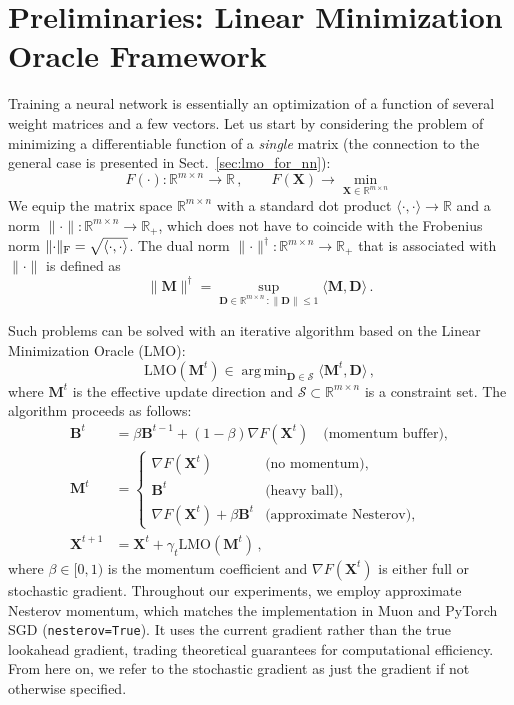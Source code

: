 \documentclass[smallextended,referee,envcountsect]{svjour3}
\def\mB{{\bm{B}}}
\def\mD{{\bm{D}}}
\def\mM{{\bm{M}}}
\def\mX{{\bm{X}}}
\newcommand{\R}{\mathbb{R}}
\DeclareMathOperator*{\argmin}{arg\,min}
\newcommand{\cS}{\mathcal{S}}
\newcommand{\norm}[1]{\lVert #1\rVert}
\DeclarePairedDelimiter{\normf}{\|}{\|_\mathrm{F}}
\def\<#1,#2>{\langle #1,#2\rangle}
\newcommand{\Rmn}{\R^{m\times n}}
\newcommand{\sectionref}[1]{Sect.~\ref{#1}}
\begin{document}
 \section{Preliminaries: Linear Minimization Oracle Framework}
 
 Training a neural network is essentially an optimization of a function of several weight matrices and a few vectors. Let us start by considering the problem of minimizing a differentiable function of a \emph{single} matrix (the connection to the general case is presented in \sectionref{sec:lmo_for_nn}):
 \begin{equation}\label{eq:matrix_problem}
   F(\cdot)\colon \Rmn \to \R\,,\qquad F(\mX) \to \min_{\mX \in \Rmn}\,
 \end{equation}
 We equip the matrix space $\Rmn$ with a standard dot product $\<\cdot, \cdot> \to \R$ and a norm $\norm{\cdot}\colon \Rmn \to \R_+$, which does not have to coincide with the Frobenius norm $\normf{\cdot} = \sqrt{\<\cdot,\cdot>}$. The dual norm $\norm{\cdot}^\dagger\colon \Rmn \to \R_+$ that is associated with $\norm{\cdot}$ is defined as
 \begin{equation}\label{eq:dual_norm}
   \norm{\mM}^\dagger = \sup_{\mD \in \Rmn\,:\norm{\mD}\leq 1} \<\mM,\mD>\,.
 \end{equation}
 
 Such problems can be solved with an iterative algorithm based on the Linear Minimization Oracle (LMO):
 \begin{equation}\label{eq:lmo}
   \mathrm{LMO}(\mM^t) \in \argmin_{\mD \in \cS} \langle\mM^t, \mD\rangle\,,
 \end{equation}
 where $\mM^t$ is the effective update direction and $\cS \subset \Rmn$ is a constraint set. The algorithm proceeds as follows:
 \begin{equation}\label{eq:simple_update}
   \begin{aligned}
   \mB^t &= \beta \mB^{t-1} + (1 - \beta) \nabla F(\mX^t) \quad \text{(momentum buffer)},\\
   \mM^t &= \begin{cases}
   \nabla F(\mX^t) & \text{(no momentum)},\\
   \mB^t & \text{(heavy ball)},\\
   \nabla F(\mX^t) + \beta \mB^t & \text{(approximate Nesterov)},
   \end{cases}\\
   \mX^{t + 1} &= \mX^t + \gamma_t\mathrm{LMO}\left(\mM^t\right)\,,
   \end{aligned}
 \end{equation}
 where $\beta \in [0, 1)$ is the momentum coefficient and $\nabla F(\mX^t)$ is either full or stochastic gradient. Throughout our experiments, we employ approximate Nesterov momentum, which matches the implementation in Muon and PyTorch SGD (\texttt{nesterov=True}). It uses the current gradient rather than the true lookahead gradient, trading theoretical guarantees for computational efficiency. From here on, we refer to the stochastic gradient as just the gradient if not otherwise specified.
 
\end{document}
